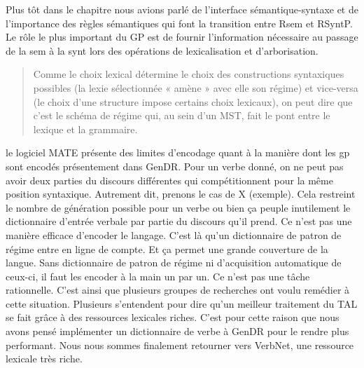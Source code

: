Plus tôt dans le chapitre nous avions parlé de l'interface sémantique-syntaxe et de l'importance des règles sémantiques qui font la transition entre Rsem et RSyntP. Le rôle le plus important du GP est de fournir l'information nécessaire au passage de la sem à la synt lors des opérations de lexicalisation et d’arborisation. 

\begin{quote}
Comme le choix lexical détermine le choix des constructions syntaxiques possibles (la lexie sélectionnée « amène » avec elle son régime) et vice-versa (le choix d’une structure impose certains choix lexicaux), on peut dire que c’est le schéma de régime qui, au sein d’un MST, fait le pont entre le lexique et la grammaire.
\end{quote}
\vspace{-\baselineskip}
\hfill
\cite[p.~105]{MilicevicSchemaregimepont2009}

le logiciel MATE présente des limites d'encodage quant à la manière dont les gp sont encodés présentement dans GenDR. Pour un verbe donné, on ne peut pas avoir deux parties du discours différentes qui compétitionnent pour la même position syntaxique. Autrement dit, prenons le cas de X (exemple). Cela restreint le nombre de génération possible pour un verbe ou bien ça peuple inutilement le dictionnaire d'entrée verbale par partie du discours qu'il prend. Ce n'est pas une manière efficace d'encoder le langage. C'est là qu'un dictionnaire de patron de régime entre en ligne de compte. Et ça permet une grande couverture de la langue. Sans dictionnaire de patron de régime ni d'acquisition automatique de ceux-ci, il faut les encoder à la main un par un. Ce n'est pas une tâche rationnelle. C'est ainsi que plusieurs groupes de recherches ont voulu remédier à cette situation. Plusieurs s'entendent pour dire qu'un meilleur traitement du \ac{TAL} se fait grâce à des ressources lexicales riches. C'est pour cette raison que nous avons pensé implémenter un dictionnaire de verbe à GenDR pour le rendre plus performant. Nous nous sommes finalement retourner vers VerbNet, une ressource lexicale très riche.
